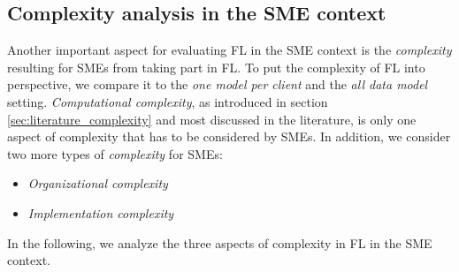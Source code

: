 \subsection{Complexity analysis in the SME context}
Another important aspect for evaluating FL in the SME context is the \emph{complexity} resulting for SMEs from taking part in FL. To put the complexity of FL into perspective, we compare it to the \emph{one model per client} and the \emph{all data model} setting.
\emph{Computational complexity}, as introduced in section \ref{sec:literature_complexity} and most discussed in the literature, is only one aspect of complexity that has to be considered by SMEs. In addition, we consider two more types of \emph{complexity} for SMEs:
\begin{itemize}
    \item \emph{Organizational complexity}
    \item \emph{Implementation complexity}
\end{itemize}
In the following, we analyze the three aspects of complexity in FL in the SME context.

